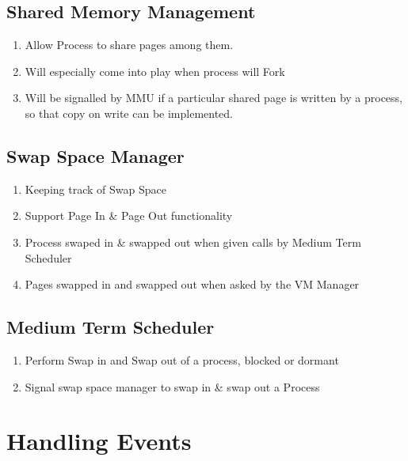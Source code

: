 \documentclass[a4paper]{article}
\begin{document}
\subsection{Shared Memory Management}
    \begin{enumerate}
        \item Allow Process to share pages among them.
        \item Will especially come into play when process will Fork
        \item Will be signalled by MMU if a particular shared page is written by a process, so that copy on write can be implemented.
        
    \end{enumerate}
    
\subsection{Swap Space Manager}
    \begin{enumerate}
        \item Keeping track of Swap Space
        \item Support Page In \& Page Out functionality 
        \item Process swaped in \& swapped out when given calls by Medium Term Scheduler
        \item Pages swapped in and swapped out when asked by the VM Manager
        
    \end{enumerate}
    
    
\subsection{Medium Term Scheduler}
    \begin{enumerate}
        \item Perform Swap in and Swap out of a process, blocked or dormant                 \item Signal swap space manager to swap in \& swap out a Process 
    \end{enumerate}

\section{Handling Events}
    
    
\end{document}
